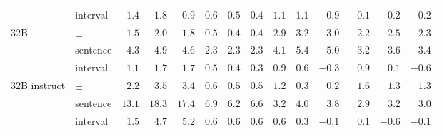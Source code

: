 \begin{tabular}{llrrrrrrrrrrrr}
 & interval & $1.4$ & $1.8$ & $0.9$ & $0.6$ & $0.5$ & $0.4$ & $1.1$ & $1.1$ & $0.9$ & $-0.1$ & $-0.2$ & $-0.2$ \\
32B & $\pm$ & $1.5$ & $2.0$ & $1.8$ & $0.5$ & $0.4$ & $0.4$ & $2.9$ & $3.2$ & $3.0$ & $2.2$ & $2.5$ & $2.3$ \\
 & sentence & $4.3$ & $4.9$ & $4.6$ & $2.3$ & $2.3$ & $2.3$ & $4.1$ & $5.4$ & $5.0$ & $3.2$ & $3.6$ & $3.4$ \\
 & interval & $1.1$ & $1.7$ & $1.7$ & $0.5$ & $0.4$ & $0.3$ & $0.9$ & $0.6$ & $-0.3$ & $0.9$ & $0.1$ & $-0.6$ \\
32B instruct & $\pm$ & $2.2$ & $3.5$ & $3.4$ & $0.6$ & $0.5$ & $0.5$ & $1.2$ & $0.3$ & $0.2$ & $1.6$ & $1.3$ & $1.3$ \\
 & sentence & $13.1$ & $18.3$ & $17.4$ & $6.9$ & $6.2$ & $6.6$ & $3.2$ & $4.0$ & $3.8$ & $2.9$ & $3.2$ & $3.0$ \\
 & interval & $1.5$ & $4.7$ & $5.2$ & $0.6$ & $0.6$ & $0.6$ & $0.6$ & $0.3$ & $-0.1$ & $0.1$ & $-0.6$ & $-0.1$ \\
\bottomrule
\end{tabular}
